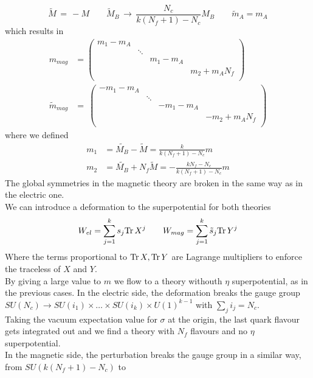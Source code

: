 \begin{equation}
 \tilde{M} \, = \, - M \qquad \tilde{M}_B \, \rightarrow \, \frac{N_c}{k (N_f+1) - N_c} M_B \qquad \tilde{m}_A = m_A
\end{equation}
which results in
\begin{align}
m_{mag} & = 
\begin{pmatrix}
 m_1 - m_A \\
& \ddots \\
&&  m_1 - m_A\\
&&& m_2 + m_A N_f\\
\end{pmatrix}
\\
\tilde{m}_{mag} & =\
\begin{pmatrix}
     - m_1 - m_A \\ & \ddots \\ &&  - m_1 - m_A \\ &&& -m_2 + m_A N_f\\   
      \end{pmatrix}
\end{align}
where we defined
\begin{align}
m_1 & = \tilde{M_B} - \tilde{M} = \frac{k}{k (N_f +1) - N_c} m\\
m_2 & = \tilde{M_B} + N_f \tilde{M} = - \frac{ k N_f - N_c}{k (N_f +1) - N_c} m
\end{align}
The global symmetries in the magnetic theory are broken in the same way as in the electric one.\\
We can introduce a deformation to the superpotential for both theories
\begin{equation}
 W_{el}= \sum_{j=1}^{k} s_j \mathrm{Tr } \,{ X^{j} } \qquad W_{mag} = \sum_{j=1}^{k}\tilde{s}_j \mathrm{Tr } \,{ Y^{j}}
\end{equation}
Where the terms proportional to $ \mathrm{Tr } \,{X},\mathrm{Tr } \,{Y}$ are Lagrange multipliers to enforce the traceless of $X$ and $Y$.\\
By giving a large value to $m$ we flow to a theory withouth $\eta$ superpotential, as in the previous cases.
In the electric side, the deformation breaks the gauge group $SU(N_c) \rightarrow SU(i_1) \times \dots \times SU(i_k) \times U(1)^{k-1}$ with $\sum_j i_j = N_c$.\\
Taking the vacuum expectation value for $\sigma$ at the origin, the last quark flavour gets integrated out and we find a theory with $N_f$ flavours and no $\eta$ superpotential.
\\
In the magnetic side, the perturbation breaks the gauge group in a similar way, from $SU( k (N_f+1) - N_c)$ to
